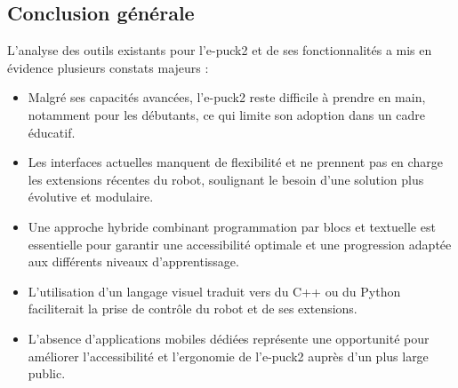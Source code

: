 \subsection{Conclusion générale} \label{sec:conclusion_recherches}

L’analyse des outils existants pour l’e-puck2 et de ses fonctionnalités a mis en évidence plusieurs constats majeurs :  

\begin{itemize}
    \item Malgré ses capacités avancées, l’e-puck2 reste difficile à prendre en main, notamment pour les débutants, ce qui limite son adoption dans un cadre éducatif.

    \item Les interfaces actuelles manquent de flexibilité et ne prennent pas en charge les extensions récentes du robot, soulignant le besoin d’une solution plus évolutive et modulaire. 

    \item Une approche hybride combinant programmation par blocs et textuelle est essentielle pour garantir une accessibilité optimale et une progression adaptée aux différents niveaux d’apprentissage.

    \item L’utilisation d’un langage visuel traduit vers du C++ ou du Python faciliterait la prise de contrôle du robot et de ses extensions.

    \item L’absence d’applications mobiles dédiées représente une opportunité pour améliorer l’accessibilité et l’ergonomie de l’e-puck2 auprès d’un plus large public.
\end{itemize}
